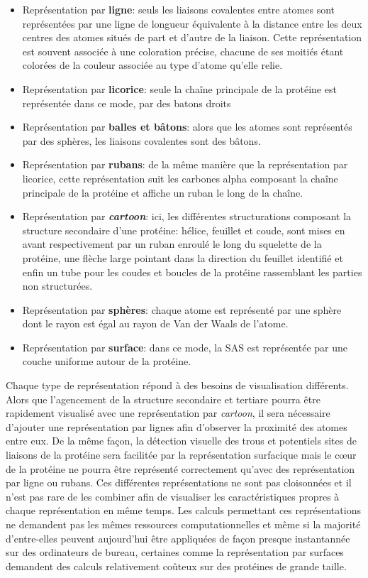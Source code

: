 \begin{itemize}
	\item Représentation par \textbf{ligne}: seuls les liaisons covalentes entre atomes sont représentées par une ligne de longueur équivalente à la distance entre les deux centres des atomes situés de part et d'autre de la liaison. Cette représentation est souvent associée à une coloration précise, chacune de ses moitiés étant colorées de la couleur associée au type d'atome qu'elle relie.
	\item Représentation par \textbf{licorice}: seule la chaîne principale de la protéine est représentée dans ce mode, par des batons droits 
	\item Représentation par \textbf{balles et bâtons}: alors que les atomes sont représentés par des sphères, les liaisons covalentes sont des bâtons.
	\item Représentation par \textbf{rubans}: de la même manière que la représentation par licorice, cette représentation suit les carbones alpha composant la chaîne principale de la protéine et affiche un ruban le long de la chaîne.
	\item Représentation par \textit{\textbf{cartoon}}: ici, les différentes structurations composant la structure secondaire d'une protéine: hélice, feuillet et coude, sont mises en avant respectivement par un ruban enroulé le long du squelette de la protéine, une flèche large pointant dans la direction du feuillet identifié et enfin un tube pour les coudes et boucles de la protéine rassemblant les parties non structurées.
	\item Représentation par \textbf{sphères}: chaque atome est représenté par une sphère dont le rayon est égal au rayon de Van der Waals de l'atome.
	\item Représentation par \textbf{surface}: dans ce mode, la SAS est représentée par une couche uniforme autour de la protéine. 
\end{itemize}

Chaque type de représentation répond à des besoins de visualisation différents. Alors que l'agencement de la structure secondaire et tertiare pourra être rapidement visualisé avec une représentation par \textit{cartoon}, il sera nécessaire d'ajouter une représentation par lignes afin d'observer la proximité des atomes entre eux. De la même façon, la détection visuelle des trous et potentiels sites de liaisons de la protéine sera facilitée par la représentation surfacique mais le cœur de la protéine ne pourra être représenté correctement qu'avec des représentation par ligne ou rubans. Ces différentes représentations ne sont pas cloisonnées et il n'est pas rare de les combiner afin de visualiser les caractéristiques propres à chaque représentation en même temps. Les calculs permettant ces représentations ne demandent pas les mêmes ressources computationnelles et même si la majorité d'entre-elles peuvent aujourd'hui être appliquées de façon presque instantannée sur des ordinateurs de bureau, certaines comme la représentation par surfaces demandent des calculs relativement coûteux sur des protéines de grande taille.


